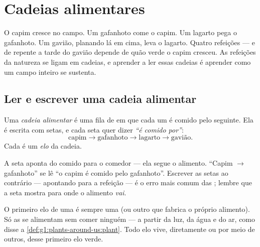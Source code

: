 \chapter{Cadeias alimentares}\label{ch:g3:food-chains}

O capim cresce no campo. Um gafanhoto come o capim. Um lagarto pega
o gafanhoto. Um gavião, planando lá em cima, leva o lagarto. Quatro
refeições --- e de repente a tarde do gavião depende de quão verde o
capim cresceu. As refeições da natureza se ligam em cadeias, e
aprender a ler essas cadeias é aprender como um campo inteiro se
sustenta.

\section{Ler e escrever uma cadeia alimentar}

\begin{definition}\label{def:g3:food-chains:chain}
Uma \emph{cadeia alimentar} é uma fila de
 em que cada um é comido pelo seguinte. Ela é escrita com
setas, e cada seta quer dizer \emph{``é comido
por''}:
\[
\text{capim} \longrightarrow \text{gafanhoto}
\longrightarrow \text{lagarto} \longrightarrow \text{gavião}.
\]
Cada  é um \emph{elo} da cadeia.
\end{definition}

\begin{remark}\label{rem:g3:food-chains:arrow}
A seta aponta do comido para o comedor --- ela segue o alimento.
``Capim $\rightarrow$ gafanhoto'' se lê ``o capim é comido pelo
gafanhoto''. Escrever as setas ao contrário --- apontando para a
refeição --- é o erro mais comum das ; lembre que
a seta mostra para onde o alimento \emph{vai}.
\end{remark}

\begin{proposition}\label{prop:g3:food-chains:start}
O primeiro elo de uma  é sempre uma  (ou outro
 que fabrica o próprio alimento). Só as  se alimentam
sem comer ninguém --- a partir da luz, da água e do ar, como disse a
\cref{def:g1:plants-around-us:plant}. Todo elo  vive,
diretamente ou por meio de outros, desse primeiro elo verde.
\end{proposition}
\admitted

